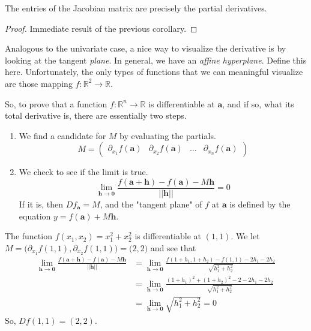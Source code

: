   \begin{corollary}
    The entries of the Jacobian matrix are precisely the partial derivatives. 
  \end{corollary}
  \begin{proof}
    Immediate result of the previous corollary. 
  \end{proof}

  Analogous to the univariate case, a nice way to visualize the derivative is by looking at the tangent \textit{plane}. In general, we have an \textit{affine hyperplane}. Define this here. Unfortunately, the only types of functions that we can meaningful visualize are those mapping $f: \mathbb{R}^2 \to \mathbb{R}$. 

  \begin{figure}[H]
    \centering 
    \caption{} 
  \end{figure}


  So, to prove that a function $f: \mathbb{R}^n \longrightarrow \mathbb{R}$ is differentiable at $\mathbf{a}$, and if so, what its total derivative is, there are essentially two steps. 
  \begin{enumerate}
    \item We find a candidate for $M$ by evaluating the partials. 
    \begin{equation}
      M = \begin{pmatrix} \partial_{x_1} f(\mathbf{a}) & \partial_{x_2} f(\mathbf{a}) & \ldots & \partial_{x_n} f(\mathbf{a}) \end{pmatrix}
    \end{equation}
    \item We check to see if the limit is true. 
    \begin{equation}
      \lim_{\mathbf{h} \rightarrow \mathbf{0}} \frac{f(\mathbf{a} + \mathbf{h}) - f(\mathbf{a}) - M \mathbf{h}}{||\mathbf{h}||} = 0
    \end{equation}
    If it is, then $D f_\mathbf{a} = M$, and the "tangent plane" of $f$ at $\mathbf{a}$ is defined by the equation $y = f(\mathbf{a}) + M \mathbf{h}$. 
  \end{enumerate}

  \begin{example}
    The function $f(x_1, x_2) = x_1^2 + x_2^2$ is differentiable at $(1, 1)$. We let $M = \big(\partial_{x_1} f(1, 1), \partial_{x_2} f(1, 1) \big) = \big(2, 2\big)$ and see that 
    \begin{align}
      \lim_{\mathbf{h} \rightarrow \mathbf{0}} \frac{f(\mathbf{a} + \mathbf{h}) - f(\mathbf{a}) - M \mathbf{h}}{||\mathbf{h}||} & = \lim_{\mathbf{h} \rightarrow \mathbf{0}} \frac{f(1 + h_1, 1 + h_2) - f(1, 1) - 2 h_1 - 2 h_2}{\sqrt{h_1^2 + h_2^2}} \\
      & = \lim_{\mathbf{h} \rightarrow \mathbf{0}} \frac{(1 + h_1)^2 + (1 + h_2)^2 - 2 - 2 h_1 - 2 h_2}{\sqrt{h_1^2 + h_2^2}} \\
      & = \lim_{\mathbf{h} \rightarrow \mathbf{0}} \sqrt{h_1^2 + h_2^2} = 0
    \end{align}
    So, $D f (1, 1) = (2, 2)$. 
  \end{example}

